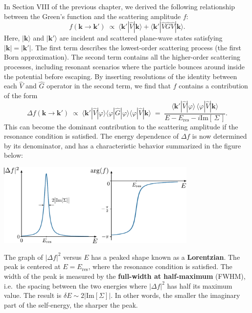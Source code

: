 \documentclass[pra,12pt]{revtex4}
\begin{document}
In Section VIII of the previous chapter, we derived the following
relationship between the Green's function and the scattering amplitude
$f$:
\begin{equation}
  f(\mathbf{k}\rightarrow\mathbf{k}') \;\propto\; \langle \mathbf{k}'|\hat{V}|\mathbf{k}\rangle + \langle \mathbf{k}'|\hat{V}\hat{G}\hat{V}|\mathbf{k}\rangle.
\end{equation}
Here, $|\mathbf{k}\rangle$ and $|\mathbf{k}'\rangle$ are incident and
scattered plane-wave states satisfying $|\mathbf{k}|=|\mathbf{k}'|$.
The first term describes the lowest-order scattering process (the
first Born approximation).  The second term contains all the
higher-order scattering processes, including resonant scenarios where
the particle bounces around inside the potential before escaping.
By inserting resolutions of the identity between each $\hat{V}$ and
$\hat{G}$ operator in the second term, we find that $f$ contains a
contribution of the form
\begin{equation}
  \Delta f(\mathbf{k}\rightarrow\mathbf{k}') \;\propto\; \langle \mathbf{k}'|\hat{V}|\varphi\rangle\langle\varphi|\hat{G}|\varphi\rangle\langle\varphi|\hat{V}|\mathbf{k}\rangle \;=\; \frac{\langle \mathbf{k}'|\hat{V}|\varphi\rangle \, \langle\varphi|\hat{V}|\mathbf{k}\rangle}{\displaystyle E - E_{\mathrm{res}} - i \mathrm{Im}[\,\Sigma\,]}.
\end{equation}
This can become the dominant contribution to the scattering amplitude
if the resonance condition is satisfied.  The energy dependence of
$\Delta f$ is now determined by its denominator, and has a
characteristic behavior summarized in the figure below:

\begin{center}
  \includegraphics[width=0.74\textwidth]{resonance}  
\end{center}

The graph of $|\Delta f|^2$ versus $E$ has a peaked shape known as a
\textbf{Lorentzian}.  The peak is centered at $E = E_{\mathrm{res}}$,
where the resonance condition is satisfied.  The width of the peak is
measured by the \textbf{full-width at half-maximum} (FWHM), i.e.~the
spacing between the two energies where $|\Delta f|^2$ has half its
maximum value.  The result is $\delta E \sim 2|\mathrm{Im}[\Sigma]|$.
In other words, the smaller the imaginary part of the self-energy, the
sharper the peak.
\end{document}
